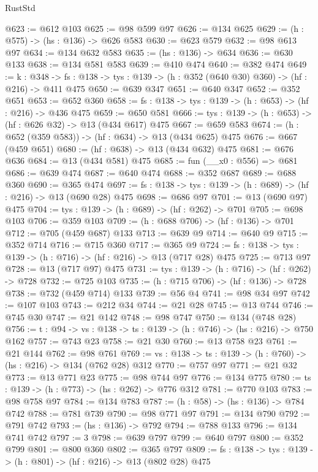 \begin{lexlean}{RustStd}
\begin{coremodule}
{\begin{coremodule}
{{{{{{{{@623 := @612 @103
@625 := @98 @599 @97
@626 := @134 @625
@629 := (h : @575) -> (hs : @136) -> @626 @583
@630 := @623 @579
@632 := @98 @613 @97
@634 := @134 @632 @583
@635 := (hs : @136) -> @634
@636 := @630 @133
@638 := @134 @581 @583
@639 := @410 @474
@640 := @382 @474
@649 := {k : @348} ->
  {fs : @138} -> {tys : @139} -> (h : @352 (@640 @30) @360) -> (hf : @216) -> @411 @475
@650 := @639 @347
@651 := @640 @347
@652 := @352 @651
@653 := @652 @360
@658 := {fs : @138} -> {tys : @139} -> (h : @653) -> (hf : @216) -> @436 @475
@659 := @650 @581
@666 := {tys : @139} -> (h : @653) -> (hf : @626 @32) -> @13 (@434 @617) @475
@667 := @659 @583
@674 := (h : @652 (@359 @583)) -> (hf : @634) -> @13 (@434 @625) @475
@676 := @667 (@459 @651)
@680 := (hf : @638) -> @13 (@434 @632) @475
@681 := @676 @636
@684 := @13 (@434 @581) @475
@685 := fun (__x0 : @556) => @681
@686 := @639 @474
@687 := @640 @474
@688 := @352 @687
@689 := @688 @360
@690 := @365 @474
@697 := {fs : @138} -> {tys : @139} -> (h : @689) -> (hf : @216) -> @13 (@690 @28) @475
@698 := @686 @97
@701 := @13 (@690 @97) @475
@704 := {tys : @139} -> (h : @689) -> (hf : @262) -> @701
@705 := @698 @103
@706 := @359 @103
@709 := (h : @688 @706) -> (hf : @136) -> @701
@712 := @705 (@459 @687) @133
@713 := @639 @9
@714 := @640 @9
@715 := @352 @714
@716 := @715 @360
@717 := @365 @9
@724 := {fs : @138} -> {tys : @139} -> (h : @716) -> (hf : @216) -> @13 (@717 @28) @475
@725 := @713 @97
@728 := @13 (@717 @97) @475
@731 := {tys : @139} -> (h : @716) -> (hf : @262) -> @728
@732 := @725 @103
@735 := (h : @715 @706) -> (hf : @136) -> @728
@738 := @732 (@459 @714) @133
@739 := @56 @4
@741 := @98 @34 @97
@742 := @107 @103
@743 := @212 @34
@744 := @21 @28
@745 := @13 @744
@746 := @745 @30
@747 := @21 @142
@748 := @98 @747
@750 := @134 (@748 @28)
@756 := {t : @94} -> {vs : @138} -> {ts : @139} -> (h : @746) -> (hs : @216) -> @750 @162
@757 := @743 @23
@758 := @21 @30
@760 := @13 @758 @23
@761 := @21 @144
@762 := @98 @761
@769 := {vs : @138} -> {ts : @139} -> (h : @760) -> (hs : @216) -> @134 (@762 @28) @312
@770 := @757 @97
@771 := @21 @32
@773 := @13 @771 @23
@775 := @98 @744 @97
@776 := @134 @775
@780 := {ts : @139} -> (h : @773) -> (hs : @262) -> @776 @312
@781 := @770 @103
@783 := @98 @758 @97
@784 := @134 @783
@787 := (h : @58) -> (hs : @136) -> @784 @742
@788 := @781 @739
@790 := @98 @771 @97
@791 := @134 @790
@792 := @791 @742
@793 := (hs : @136) -> @792
@794 := @788 @133
@796 := @134 @741 @742
@797 := 3
@798 := @639 @797
@799 := @640 @797
@800 := @352 @799
@801 := @800 @360
@802 := @365 @797
@809 := {fs : @138} -> {tys : @139} -> (h : @801) -> (hf : @216) -> @13 (@802 @28) @475
}}}}}}}}
\end{coremodule}}
\end{coremodule}
\end{lexlean}
